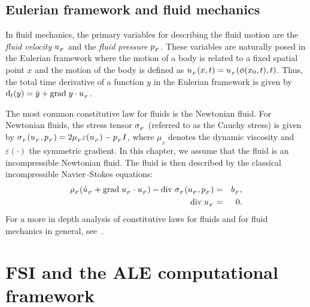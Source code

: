 \subsection{Eulerian framework and fluid mechanics}
\label{selim:sec:fluid}

In fluid mechanics, the primary variables for describing the fluid
motion are the \emph{fluid velocity} $u_{_{F}}$ and the \emph{fluid
  pressure} $p_{_{F}}$. These variables are naturally posed in the Eulerian
framework where the motion of a body is related to a fixed spatial
point $x$ and the motion of the body is defined as $u_{_{F}}(x,t) =
u_{_{F}}(\phi(x_0,t),t)$. Thus, the total time derivative of a function $y$
in the Eulerian framework is given by $\textrm{d}_t(y) = \dot{y} +
\textrm{grad}\;y\cdot u_{_{F}}$.

The most common constitutive law for fluids is the Newtonian fluid.
For Newtonian fluids, the stress tensor $\sigma_{_{F}}$ (referred to as the
Cauchy stress) is given by $\sigma_{_{F}}(u_{_{F}}, p_{_{F}}) = 2\mu_{_{F}}\varepsilon (u_{_{F}}) -
p_{_{F}} I$, where $\mu_{_{F}}$ denotes the dynamic viscosity and
$\varepsilon(\cdot)$ the symmetric gradient. In this chapter, we
assume that the fluid is an incompressible Newtonian fluid. The fluid
is then described by the classical incompressible Navier--Stokes
equations:
\begin{eqnarray}
  \label{selim:eq:NSmom}
      \rho_{_{F}}(\dot{u}_{_{F}} + \textrm{grad}\;u_{_{F}}\cdot u_{_{F}})- \textrm{div}\;
      \sigma_{_{F}}(u_{_{F}}, p_{_{F}}) &=& b_{_{F}},\\
  \label{selim:eq:NScon}
      \textrm{div}\; u_{_{F}} &=& 0.
\end{eqnarray}
For a more in depth analysis of constitutive laws for fluids and for
fluid mechanics in general, see~\citet{Batchelor1967,Panton1984,
WeltyWicksWilson2001}.
\section{FSI and the ALE computational framework}
\label{selim:sec:ale}

